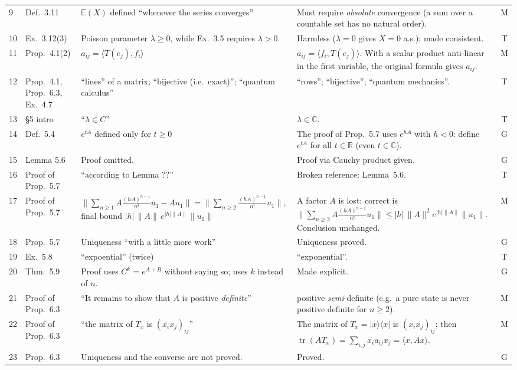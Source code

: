 \documentclass[11pt,a4paper]{article}
\numberwithin{equation}{section}
\newcommand{\R}{\mathbb{R}}
\newcommand{\C}{\mathbb{C}}
\newcommand{\E}{\mathbb{E}}
\newcommand{\ip}[2]{\langle #1, #2\rangle}
\newcommand{\ketbra}[2]{|#1\rangle\langle #2|}
\newcommand{\conj}[1]{\overline{#1}}
\DeclareMathOperator{\tr}{tr}
\theoremstyle{plain}
\theoremstyle{definition}
\theoremstyle{plain}
\theoremstyle{definition}
\begin{document}
{\begin{longtable}{@{}p{0.6cm}p{1.9cm}p{5.6cm}p{6.0cm}c@{}}
9 & Def.~3.11 & $\E(X)$ defined ``whenever the series converges'' & Must require \emph{absolute} convergence (a sum over a countable set has no natural order). & M\\
10 & Ex.~3.12(3) & Poisson parameter $\lambda\geqslant 0$, while Ex.~3.5 requires $\lambda>0$. & Harmless ($\lambda=0$ gives $X=0$ a.s.); made consistent. & T\\
11 & Prop.~4.1(2) & $a_{ij}=\ip{T(e_j)}{f_i}$ & $a_{ij}=\ip{f_i}{T(e_j)}$. With a scalar product anti-linear in the first variable, the original formula gives $\conj{a_{ij}}$. & M\\
12 & Prop.~4.1, Prop.~6.3, Ex.~4.7 & ``lines'' of a matrix; ``bijective (i.e.\ exact)''; ``quantum calculus'' & ``rows''; ``bijective''; ``quantum mechanics''. & T\\
13 & \S5 intro & ``$\lambda\in C$'' & $\lambda\in\C$. & T\\
14 & Def.~5.4 & $e^{tA}$ defined only for $t\geqslant 0$ & The proof of Prop.~5.7 uses $e^{hA}$ with $h<0$: define $e^{tA}$ for all $t\in\R$ (even $t\in\C$). & G\\
15 & Lemma 5.6 & Proof omitted. & Proof via Cauchy product given. & G\\
16 & Proof of Prop.~5.7 & ``according to Lemma ??'' & Broken reference: Lemma~5.6. & T\\
17 & Proof of Prop.~5.7 & $\big\|\sum_{n\ge1}A\frac{(hA)^{n-1}}{n!}u_1-Au_1\big\| = \big\|\sum_{n\ge2}\frac{(hA)^{n-1}}{n!}u_1\big\|$, final bound $|h|\,\|A\|\,e^{|h|\|A\|}\|u_1\|$ & A factor $A$ is lost: correct is $\big\|\sum_{n\ge2}A\frac{(hA)^{n-1}}{n!}u_1\big\|\le |h|\,\|A\|^2e^{|h|\|A\|}\|u_1\|$. Conclusion unchanged. & M\\
18 & Prop.~5.7 & Uniqueness ``with a little more work'' & Uniqueness proved. & G\\
19 & Ex.~5.8 & ``expoential'' (twice) & ``exponential''. & T\\
20 & Thm.~5.9 & Proof uses $C^k=e^{A+B}$ without saying so; uses $k$ instead of $n$. & Made explicit. & G\\
21 & Proof of Prop.~6.3 & ``It remains to show that $A$ is positive \emph{definite}'' & positive \emph{semi}-definite (e.g.\ a pure state is never positive definite for $n\ge2$). & M\\
22 & Proof of Prop.~6.3 & ``the matrix of $T_x$ is $(\conj{x_i}x_j)_{ij}$'' & The matrix of $T_x=\ketbra{x}{x}$ is $(x_i\conj{x_j})_{ij}$; then $\tr(AT_x)=\sum_{i,j}\conj{x_i}a_{ij}x_j=\ip{x}{Ax}$. & M\\
23 & Prop.~6.3 & Uniqueness and the converse are not proved. & Proved. & G\\

\end{longtable}}
\end{document}
